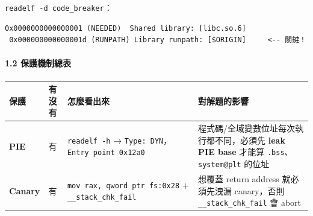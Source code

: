 \documentclass[10pt,a4paper]{article}
\newcounter{none}
\begin{document}
\texttt{readelf\ \allowbreak{}-\allowbreak{}d\ \allowbreak{}code\_\allowbreak{}breaker}：

\begin{Verbatim}[breaklines=true,breakanywhere=true,breakautoindent=false,fontsize=\fontsize{7.0}{9.5}\selectfont]
 0x0000000000000001 (NEEDED)  Shared library: [libc.so.6]
 0x000000000000001d (RUNPATH) Library runpath: [$ORIGIN]     <-- 關鍵！
\end{Verbatim}

\paragraph{1.2 保護機制總表}\label{ux4fddux8b77ux6a5fux5236ux7e3dux8868}

{\def\LTcaptype{none} %
\begin{longtable}[]{@{}
  >{\raggedright\arraybackslash}p{}
  >{\raggedright\arraybackslash}p{}
  >{\raggedright\arraybackslash}p{}
  >{\raggedright\arraybackslash}p{}@{}}
\toprule\noalign{}
\begin{minipage}[b]{\linewidth}\raggedright
保護
\end{minipage} & \begin{minipage}[b]{\linewidth}\raggedright
有沒有
\end{minipage} & \begin{minipage}[b]{\linewidth}\raggedright
怎麼看出來
\end{minipage} & \begin{minipage}[b]{\linewidth}\raggedright
對解題的影響
\end{minipage} \\
\midrule\noalign{}
\endhead
\bottomrule\noalign{}
\endlastfoot
\textbf{PIE} & 有 & \texttt{readelf\ \allowbreak{}-\allowbreak{}h} →
\texttt{Type:\allowbreak{}\ \allowbreak{}DYN}，\texttt{Entry\ \allowbreak{}point\ \allowbreak{}0x12a0} &
程式碼/全域變數位址每次執行都不同，必須先 \textbf{leak PIE base} 才能算
\texttt{.\allowbreak{}bss}、\texttt{system@plt} 的位址 \\
\textbf{Canary} & 有 & \texttt{mov\ \allowbreak{}rax,\allowbreak{}\ \allowbreak{}qword\ \allowbreak{}ptr\ \allowbreak{}fs:\allowbreak{}0x28} +
\texttt{\_\allowbreak{}\_\allowbreak{}stack\_\allowbreak{}chk\_\allowbreak{}fail} & 想覆蓋 return address 就必須先洩漏
canary，否則 \texttt{\_\allowbreak{}\_\allowbreak{}stack\_\allowbreak{}chk\_\allowbreak{}fail} 會 abort \\

\end{longtable}}
\end{document}
